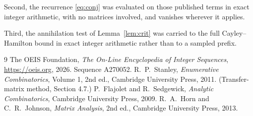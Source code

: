 \documentclass[11pt,a4paper]{article}
\theoremstyle{plain}
\theoremstyle{definition}
\begin{document}
Second, the recurrence \eqref{eq:conj} was evaluated on those published terms in exact
integer arithmetic, with no matrices involved, and vanishes wherever it applies.

Third, the annihilation test of Lemma~\ref{lem:crit} was carried to the full
Cayley--Hamilton bound in exact integer arithmetic rather than to a sampled prefix.

\begin{thebibliography}{9}
 The OEIS Foundation, \emph{The On-Line Encyclopedia of Integer
Sequences}, \url{https://oeis.org}, 2026. Sequence A270052.
 R.~P.~Stanley, \emph{Enumerative Combinatorics}, Volume 1, 2nd ed.,
Cambridge University Press, 2011. (Transfer-matrix method, Section 4.7.)
 P.~Flajolet and R.~Sedgewick, \emph{Analytic Combinatorics}, Cambridge
University Press, 2009.
 R.~A.~Horn and C.~R.~Johnson, \emph{Matrix Analysis}, 2nd ed., Cambridge
University Press, 2013.
\end{thebibliography}
\end{document}
